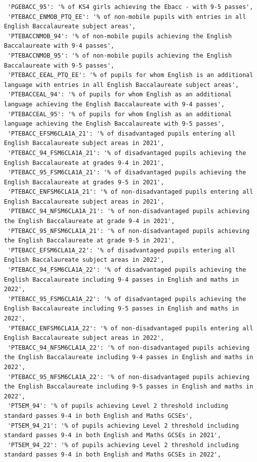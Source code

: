 \documentclass[
  letterpaper,
  DIV=11,
  numbers=noendperiod]{scrartcl}
\begin{document}
\begin{verbatim}
 'PGEBACC_95': '% of KS4 girls achieving the Ebacc - with 9-5 passes',
 'PTEBACC_ENMOB_PTQ_EE': '% of non-mobile pupils with entries in all English Baccalaureate subject areas',
 'PTEBACCNMOB_94': '% of non-mobile pupils achieving the English Baccalaureate with 9-4 passes',
 'PTEBACCNMOB_95': '% of non-mobile pupils achieving the English Baccalaureate with 9-5 passes',
 'PTEBACC_EEAL_PTQ_EE': '% of pupils for whom English is an additional language with entries in all English Baccalaureate subject areas',
 'PTEBACCEAL_94': '% of pupils for whom English as an additional language achieving the English Baccalaureate with 9-4 passes',
 'PTEBACCEAL_95': '% of pupils for whom English as an additional language achieving the English Baccalaureate with 9-5 passes',
 'PTEBACC_EFSM6CLA1A_21': '% of disadvantaged pupils entering all English Baccalaureate subject areas in 2021',
 'PTEBACC_94_FSM6CLA1A_21': '% of disadvantaged pupils achieving the English Baccalaureate at grades 9-4 in 2021',
 'PTEBACC_95_FSM6CLA1A_21': '% of disadvantaged pupils achieving the English Baccalaureate at grades 9-5 in 2021',
 'PTEBACC_ENFSM6CLA1A_21': '% of non-disadvantaged pupils entering all English Baccalaureate subject areas in 2021',
 'PTEBACC_94_NFSM6CLA1A_21': '% of non-disadvantaged pupils achieving the English Baccalaureate at grade 9-4 in 2021',
 'PTEBACC_95_NFSM6CLA1A_21': '% of non-disadvantaged pupils achieving the English Baccalaureate at grade 9-5 in 2021',
 'PTEBACC_EFSM6CLA1A_22': '% of disadvantaged pupils entering all English Baccalaureate subject areas in 2022',
 'PTEBACC_94_FSM6CLA1A_22': '% of disadvantaged pupils achieving the English Baccalaureate including 9-4 passes in English and maths in 2022',
 'PTEBACC_95_FSM6CLA1A_22': '% of disadvantaged pupils achieving the English Baccalaureate including 9-5 passes in English and maths in 2022',
 'PTEBACC_ENFSM6CLA1A_22': '% of non-disadvantaged pupils entering all English Baccalaureate subject areas in 2022',
 'PTEBACC_94_NFSM6CLA1A_22': '% of non-disadvantaged pupils achieving the English Baccalaureate including 9-4 passes in English and maths in 2022',
 'PTEBACC_95_NFSM6CLA1A_22': '% of non-disadvantaged pupils achieving the English Baccalaureate including 9-5 passes in English and maths in 2022',
 'PT5EM_94': '% of pupils achieving Level 2 threshold including standard passes 9-4 in both English and Maths GCSEs',
 'PT5EM_94_21': '% of pupils achieving Level 2 threshold including standard passes 9-4 in both English and Maths GCSEs in 2021',
 'PT5EM_94_22': '% of pupils achieving Level 2 threshold including standard passes 9-4 in both English and Maths GCSEs in 2022',

\end{verbatim}
\end{document}
